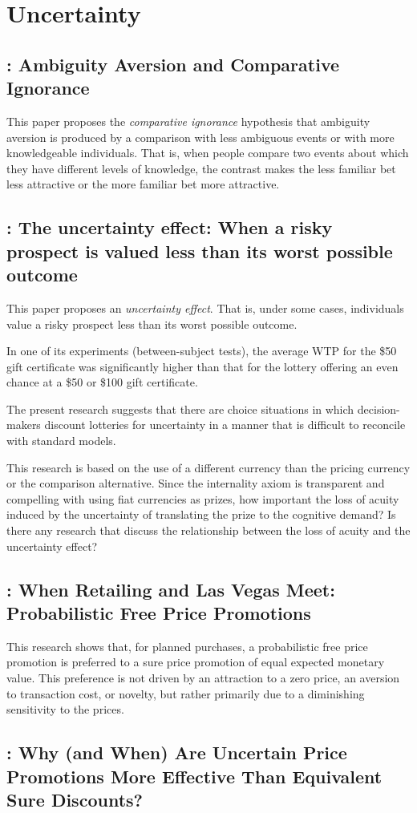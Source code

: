 \documentclass[11pt]{elegantbook}
\begin{document}
\chapter{Uncertainty}
\section{\cite{fox1995ambiguity}: Ambiguity Aversion and Comparative Ignorance}
This paper proposes the \textit{comparative ignorance} hypothesis that ambiguity aversion is produced by a comparison with less ambiguous events or with more knowledgeable individuals. That is, when people compare two events about which they have different levels of knowledge, the contrast makes the less familiar bet less attractive or the more familiar bet more attractive.


\section{\cite{gneezy2006uncertainty}: The uncertainty effect: When a risky prospect is valued less than its worst possible outcome}
This paper proposes an \textit{uncertainty effect}. That is, under some cases, individuals value a risky prospect less than its worst possible outcome.

In one of its experiments (between-subject tests), the average WTP for the \$50 gift certificate was significantly higher than that for the lottery offering an even chance at a \$50 or \$100 gift certificate.

The present research suggests that there are choice situations in which decision-makers discount lotteries for uncertainty in a manner that is difficult to reconcile with standard models.

This research is based on the use of a different currency than the pricing currency or the comparison alternative. Since the internality axiom is transparent and compelling with using fiat currencies as prizes, how important the loss of acuity induced by the uncertainty of translating the prize to the cognitive demand? Is there any research that discuss the relationship between the loss of acuity and the uncertainty effect?



\section{\cite{mazar2017retailing}: When Retailing and Las Vegas Meet: Probabilistic Free Price Promotions}
This research shows that, for planned purchases, a probabilistic free price promotion is preferred to a sure price promotion of equal expected monetary value.  This preference is not driven by an attraction to a zero price, an aversion to transaction cost, or novelty, but rather primarily due to a diminishing sensitivity to the prices.


\section{\cite{gaertig2018and}: Why (and When) Are Uncertain Price Promotions More Effective Than Equivalent Sure Discounts? }





\end{document}
